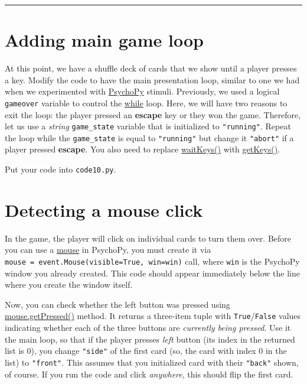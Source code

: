 \documentclass[
]{book}
\begin{document}
\begin{center}\rule{0.5\linewidth}{0.5pt}\end{center}

\hypertarget{adding-main-game-loop}{%
\section{Adding main game loop}\label{adding-main-game-loop}}

At this point, we have a shuffle deck of cards that we show until a player presses a key. Modify the code to have the main presentation loop, similar to one we had when we experimented with \protect\hyperlink{psychopy-basics}{PsychoPy} stimuli. Previously, we used a logical \texttt{gameover} variable to control the \protect\hyperlink{ux5cux23while-loop}{while} loop. Here, we will have two reasons to exit the loop: the player pressed an \textbf{escape} key or they won the game. Therefore, let us use a \emph{string} \texttt{game\_state} variable that is initialized to \texttt{"running"}. Repeat the loop while the \texttt{game\_state} is equal to \texttt{"running"} but change it \texttt{"abort"} if a player pressed \textbf{escape}. You also need to replace \href{https://psychopy.org/api/event.html\#psychopy.event.waitKeys}{waitKeys()} with \href{https://psychopy.org/api/event.html\#psychopy.event.getKeys}{getKeys()}.

Put your code into \texttt{code10.py}.

\hypertarget{psychopy-mouse}{%
\section{Detecting a mouse click}\label{psychopy-mouse}}

In the game, the player will click on individual cards to turn them over. Before you can use a \href{https://psychopy.org/api/event.html\#psychopy.event.Mouse}{mouse} in PsychoPy, you must create it via \texttt{mouse\ =\ event.Mouse(visible=True,\ win=win)} call, where \texttt{win} is the PsychoPy window you already created. This code should appear immediately below the line where you create the window itself.

Now, you can check whether the left button was pressed using \href{https://psychopy.org/api/event.html\#psychopy.event.Mouse.getPressed}{mouse.getPressed()} method. It returns a three-item tuple with \texttt{True}/\texttt{False} values indicating whether each of the three buttons are \emph{currently being pressed}. Use it the main loop, so that if the player presses \emph{left} button (its index in the returned list is 0), you change \texttt{"side"} of the first card (so, the card with index 0 in the list) to \texttt{"front"}. This assumes that you initialized card with their \texttt{"back"} shown, of course. If you run the code and click \emph{anywhere}, this should flip the first card.
\end{document}
